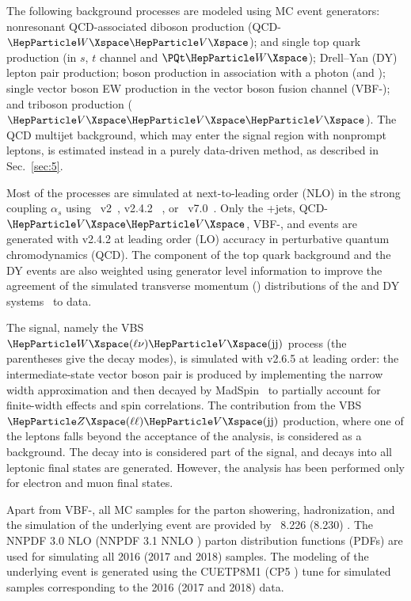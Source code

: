 The following background processes are modeled using MC event generators: nonresonant QCD-associated diboson production
(QCD-$\PW\PV$);
\ttbar and single top quark production (in $s$, $t$ channel and $\PQt\PW$);
Drell--Yan (DY) lepton pair production; {\PV} boson production in association with a photon (\wg and \zg); single vector
boson EW production in the vector boson fusion channel (VBF-{\PV}); and triboson production ($\PV\PV\PV$).  The QCD
multijet background, which may enter the signal region with nonprompt leptons, is estimated instead in a purely
data-driven method, as described in Sec.~\ref{sec:5}.

Most of the processes are simulated at next-to-leading order (NLO) in the strong coupling $\alpha_{s}$ using
\POWHEG~v2~\cite{Frixione:2002ik,Nason:2004rx,Frixione:2007vw,Alioli:2008gx,Alioli:2010xd}, 
\MGvATNLO v2.4.2 ~\cite{Alwall:2014hca,Alwall:2007fs}, 
or \MCFM~v7.0~\cite{campbell_precision_2019,campbell_multi-threaded_2015,campbell_vector_2011,campbell_update_1999}. 
Only the {\PW}+jets, QCD-$\PV\PV$, VBF-{\PV}, and \wg events are generated with \MGvATNLO v2.4.2 at leading order (LO)
accuracy in perturbative quantum chromodynamics (QCD).  The \ttbar component of the top quark background and the DY
events are also weighted using generator level information to improve the agreement of the simulated transverse momentum
(\pt) distributions of the \ttbar and DY systems~\cite{Czakon:2017wor,CMS:2016oae,CMS:2019raw} to data.

The signal, namely the VBS $\PW(\ell\nu)\PV(\mathrm{jj})$ process (the parentheses give the decay modes), is simulated
with \MGvATNLO v2.6.5 at leading order: the intermediate-state vector boson pair is produced by implementing the narrow
width approximation and then decayed by MadSpin~\cite{Madspin} to partially account for finite-width effects and spin
correlations.  The contribution from the VBS $\PZ(\ell\ell)\PV(\mathrm{jj})$ production, where one of the leptons falls
beyond the acceptance of the analysis, is considered as a background.  The {\PW} decay into \PGt is considered part of
the signal, and {\PW} decays into all leptonic final states are generated. However, the analysis has been performed
only for electron and muon final states.

Apart from VBF-{\PV}, all MC samples for the parton showering, hadronization, and the simulation of the underlying event
are provided by \PYTHIA~8.226 (8.230) \cite{Sjostrand:2014zea,Alioli:2010xd}.  The NNPDF 3.0 NLO \cite{Ball:2014uwa}
(NNPDF 3.1 NNLO \cite{Ball:2017nwa}) parton distribution functions (PDFs) are used for simulating all 2016 (2017 and
2018) samples.  The modeling of the underlying event is generated using the CUETP8M1 \cite{Skands:2014pea,CMS:2015wcf}
(CP5 \cite{CMS:2019csb}) tune for simulated samples corresponding to the 2016 (2017 and 2018) data.

